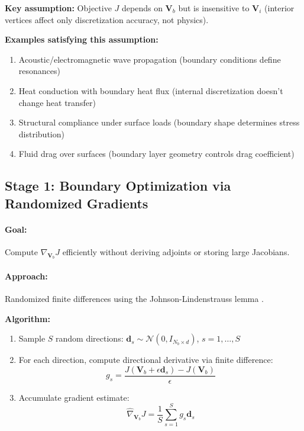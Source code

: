 \documentclass{article}
\begin{document}
\textbf{Key assumption:} Objective $J$ depends on $\mathbf{V}_b$ but is insensitive to $\mathbf{V}_i$ (interior vertices affect only discretization accuracy, not physics).

\textbf{Examples satisfying this assumption:}
\begin{enumerate}
    \item Acoustic/electromagnetic wave propagation (boundary conditions define resonances)
    \item Heat conduction with boundary heat flux (internal discretization doesn't change heat transfer)
    \item Structural compliance under surface loads (boundary shape determines stress distribution)
    \item Fluid drag over surfaces (boundary layer geometry controls drag coefficient)
\end{enumerate}

\subsection{Stage 1: Boundary Optimization via Randomized Gradients}

\paragraph{Goal:} Compute $\nabla_{\mathbf{V}_b} J$ efficiently without deriving adjoints or storing large Jacobians.

\paragraph{Approach:} Randomized finite differences using the Johnson-Lindenstrauss lemma \cite{johnson1984extensions}.

\textbf{Algorithm:}
\begin{enumerate}
    \item Sample $S$ random directions: $\mathbf{d}_s \sim \mathcal{N}(0, I_{N_b \times d})$, $s = 1, \ldots, S$
    \item For each direction, compute directional derivative via finite difference:
    \begin{equation}
        g_s = \frac{J(\mathbf{V}_b + \epsilon \mathbf{d}_s) - J(\mathbf{V}_b)}{\epsilon}
    \end{equation}
    \item Accumulate gradient estimate:
    \begin{equation}
        \hat{\nabla}_{\mathbf{V}_b} J = \frac{1}{S} \sum_{s=1}^S g_s \mathbf{d}_s
        \label{eq:randomized_gradient}
    \end{equation}
\end{enumerate}
\end{document}
